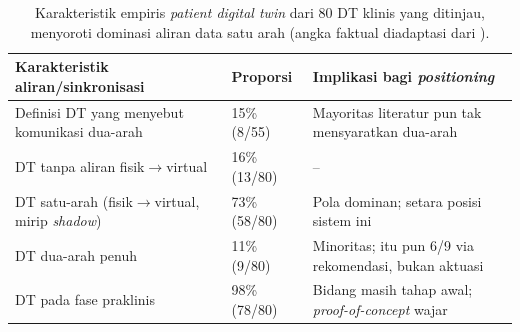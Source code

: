 \begin{table}[htbp]
\centering
\caption{Karakteristik empiris \emph{patient digital twin} dari 80 DT klinis yang ditinjau, menyoroti dominasi aliran data satu arah (angka faktual diadaptasi dari \textcite{drummond2024}).}
\label{tab:karakteristik-dt}
\small
\begin{tabular}{@{}p{6cm}p{2cm}p{5.3cm}@{}}
\toprule
\textbf{Karakteristik aliran/sinkronisasi} & \textbf{Proporsi} & \textbf{Implikasi bagi \emph{positioning}} \\
\midrule
Definisi DT yang menyebut komunikasi dua-arah & 15\% (8/55) & Mayoritas literatur pun tak mensyaratkan dua-arah \\[2pt]
DT tanpa aliran fisik$\rightarrow$virtual & 16\% (13/80) & -- \\[2pt]
DT satu-arah (fisik$\rightarrow$virtual, mirip \emph{shadow}) & 73\% (58/80) & Pola dominan; setara posisi sistem ini \\[2pt]
DT dua-arah penuh & 11\% (9/80) & Minoritas; itu pun 6/9 via rekomendasi, bukan aktuasi \\[2pt]
DT pada fase praklinis & 98\% (78/80) & Bidang masih tahap awal; \emph{proof-of-concept} wajar \\
\bottomrule
\end{tabular}
\end{table}
